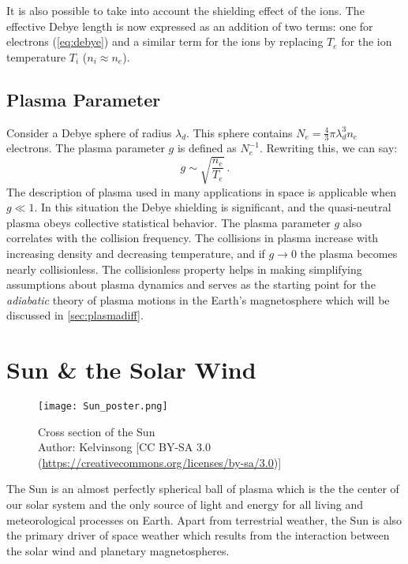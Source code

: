 It is also possible to take into account the shielding effect of the ions. The effective Debye 
length is now expressed as an addition of two terms: one for electrons (\cref{eq:debye}) and a 
similar term for the ions by replacing $T_e$ for the ion temperature $T_i$ ($n_i \approx n_e$). 

\subsection*{Plasma Parameter}

Consider a Debye sphere of radius $\lambda_d$. This sphere contains 
$N_e = \frac{4}{3}\pi \lambda^3_d n_e$ electrons. The plasma parameter $g$ is defined as 
$N_{e}^{-1}$. Rewriting this, we can say:
%
\[
    g \sim \sqrt{\frac{n_e}{T_e}} \ .
\]
%
The description of plasma used in many applications in space is applicable when $g \ll 1$. In 
this situation the Debye shielding is significant, and the quasi-neutral plasma obeys collective 
statistical behavior. The plasma parameter $g$ also correlates with the collision frequency. The 
collisions in plasma increase with increasing density and decreasing temperature, and if 
$g \longrightarrow 0$ the plasma becomes nearly collisionless. The collisionless property helps in 
making simplifying assumptions about plasma dynamics and serves as the starting point for the 
\emph{adiabatic} theory of plasma motions in the Earth's magnetosphere which will be discussed in 
\cref{sec:plasmadiff}.

\section{Sun \& the Solar Wind}\label{sec:solar}

\begin{figure}
    \noindent\centering\texttt{[image: Sun\_poster.png]}
    \caption{{\small Cross section of the Sun \\ 
    Author: Kelvinsong [CC BY-SA 3.0 (\url{https://creativecommons.org/licenses/by-sa/3.0})]}}
    \label{fig:SunLayers}
\end{figure}

The Sun is an almost perfectly spherical ball of plasma which is the the center of our solar 
system and the only source of light and energy for all living and meteorological processes on 
Earth. Apart from terrestrial weather, the Sun is also the primary driver of space weather which 
results from the interaction between the solar wind and planetary magnetospheres.

